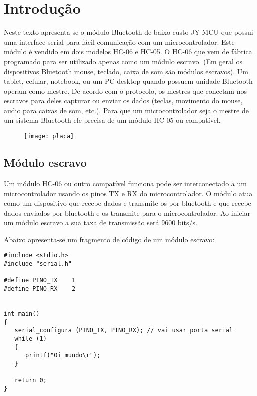 \documentclass[a4paper,10pt]{article}
\begin{document}




\section{Introdução}

Neste texto apresenta-se o módulo Bluetooth de baixo custo JY-MCU que possui uma interface serial 
para fácil comunicação com um microcontrolador. Este módulo é vendido em dois modelos HC-06 e  HC-05. O 
HC-06 que vem de fábrica programado para ser utilizado apenas como um módulo escravo. (Em geral os dispositivos Bluetooth mouse, teclado, caixa de som são 
módulos 
escravos).  Um tablet, celular, notebook, ou um PC desktop quando possuem unidade Bluetooth 
operam como mestre. De acordo com o protocolo, os mestres que conectam nos escravos para deles capturar ou enviar os dados (teclas, movimento do mouse, audio 
para caixas de som, etc.). Para que um microcontrolador seja o mestre de um sistema Bluetooth ele precisa de um módulo HC-05 ou compatível.  

\begin{figure}[htb]
 \centering\texttt{[image: placa]}
\end{figure}

\subsection{Módulo escravo}

Um módulo HC-06 ou outro compatível funciona pode ser interconectado a um microcontrolador usando os pinos TX e RX do microcontrolador. O módulo atua como um dispositivo que recebe dados e transmite-os por bluetooth e que recebe dados enviados por bluetooth e os transmite para o microcontrolador. Ao iniciar um módulo escravo a sua taxa de transmissão será 9600 bits/s.



Abaixo apresenta-se um fragmento de código de um módulo escravo:

\begin{lstlisting}[numbers=none,basicstyle=\footnotesize\ttfamily]
#include <stdio.h>
#include "serial.h"

#define PINO_TX    1
#define PINO_RX    2


int main()
{
   serial_configura (PINO_TX, PINO_RX); // vai usar porta serial
   while (1)
   {
      printf("Oi mundo\r");
   }

   return 0;
}
\end{lstlisting}
\end{document}
